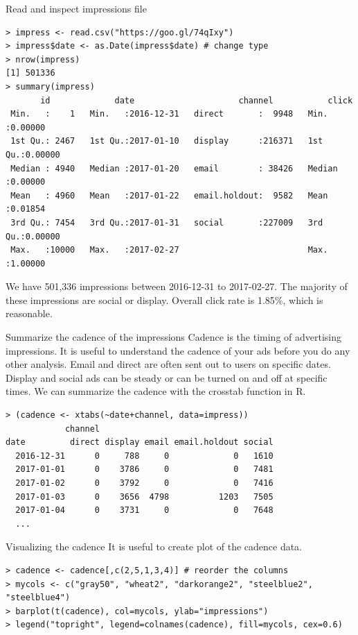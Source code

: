 \documentclass[10pt, aspectratio=169]{beamer}
\begin{document}
\begin{frame}[fragile]{Read and inspect \alert{impressions file}}
\begin{lstlisting}
> impress <- read.csv("https://goo.gl/74qIxy")
> impress$date <- as.Date(impress$date) # change type
> nrow(impress)
[1] 501336
> summary(impress)
       id             date                     channel           click        
 Min.   :    1   Min.   :2016-12-31   direct       :  9948   Min.   :0.00000  
 1st Qu.: 2467   1st Qu.:2017-01-10   display      :216371   1st Qu.:0.00000  
 Median : 4940   Median :2017-01-20   email        : 38426   Median :0.00000  
 Mean   : 4960   Mean   :2017-01-22   email.holdout:  9582   Mean   :0.01854  
 3rd Qu.: 7454   3rd Qu.:2017-01-31   social       :227009   3rd Qu.:0.00000  
 Max.   :10000   Max.   :2017-02-27                          Max.   :1.00000  
\end{lstlisting}
\alert{We have 501,336 impressions between 2016-12-31 to 2017-02-27.  The majority of these impressions are social or display.  Overall click rate is 1.85\%, which is reasonable.}
\end{frame}

\begin{frame}[fragile]{Summarize the cadence of the impressions}
\alert{Cadence} is the timing of advertising impressions.  It is useful to understand the cadence of your ads before you do any other analysis. Email and direct are often sent out to users on specific dates.  Display and social ads can be steady or can be turned on and off at specific times. We can summarize the cadence with the crosstab function in R.
\begin{lstlisting}
> (cadence <- xtabs(~date+channel, data=impress))  
            channel
date         direct display email email.holdout social
  2016-12-31      0     788     0             0   1610
  2017-01-01      0    3786     0             0   7481
  2017-01-02      0    3792     0             0   7416
  2017-01-03      0    3656  4798          1203   7505
  2017-01-04      0    3731     0             0   7648
  ...
\end{lstlisting}
\end{frame}

\begin{frame}[fragile]{Visualizing the cadence}
It is useful to create plot of the cadence data. 
\begin{lstlisting}
> cadence <- cadence[,c(2,5,1,3,4)] # reorder the columns
> mycols <- c("gray50", "wheat2", "darkorange2", "steelblue2", "steelblue4")
> barplot(t(cadence), col=mycols, ylab="impressions") 
> legend("topright", legend=colnames(cadence), fill=mycols, cex=0.6)
\end{lstlisting}
\end{frame}
\end{document}
